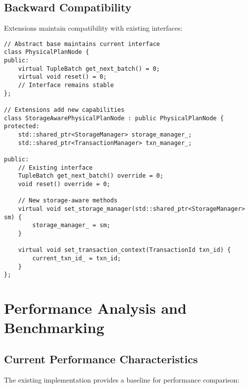\documentclass[12pt,a4paper]{article}
\begin{document}
    \subsection{Backward Compatibility}

    Extensions maintain compatibility with existing interfaces:

    \begin{lstlisting}[style=cpp, caption=Interface Compatibility Design]
// Abstract base maintains current interface
class PhysicalPlanNode {
public:
    virtual TupleBatch get_next_batch() = 0;
    virtual void reset() = 0;
    // Interface remains stable
};

// Extensions add new capabilities
class StorageAwarePhysicalPlanNode : public PhysicalPlanNode {
protected:
    std::shared_ptr<StorageManager> storage_manager_;
    std::shared_ptr<TransactionManager> txn_manager_;
    
public:
    // Existing interface
    TupleBatch get_next_batch() override = 0;
    void reset() override = 0;
    
    // New storage-aware methods
    virtual void set_storage_manager(std::shared_ptr<StorageManager> sm) {
        storage_manager_ = sm;
    }
    
    virtual void set_transaction_context(TransactionId txn_id) {
        current_txn_id_ = txn_id;
    }
};
    \end{lstlisting}

    \section{Performance Analysis and Benchmarking}

    \subsection{Current Performance Characteristics}

    The existing implementation provides a baseline for performance comparison:
\end{document}
